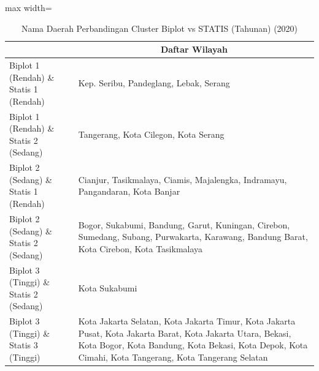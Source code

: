 \begin{table}[H]
\centering
\caption{Nama Daerah Perbandingan Cluster Biplot vs STATIS (Tahunan) (2020)} \label{tab:app1biplot_statis_comp_name_2020}
\begin{adjustbox}{max width=\textwidth}
\begin{tabular}{|>{\centering\arraybackslash}p{4cm}|p{10cm}|}
\hline
\multicolumn{1}{|c|}{\textbf{Kategori}} & \multicolumn{1}{c|}{\textbf{Daftar Wilayah}} \\
\hline
Biplot 1 (Rendah) \& Statis 1 (Rendah) & Kep. Seribu, Pandeglang, Lebak, Serang \\
\hline
Biplot 1 (Rendah) \& Statis 2 (Sedang) & Tangerang, Kota Cilegon, Kota Serang \\
\hline
Biplot 2 (Sedang) \& Statis 1 (Rendah) & Cianjur, Tasikmalaya, Ciamis, Majalengka, Indramayu, Pangandaran, Kota Banjar \\
\hline
Biplot 2 (Sedang) \& Statis 2 (Sedang) & Bogor, Sukabumi, Bandung, Garut, Kuningan, Cirebon, Sumedang, Subang, Purwakarta, Karawang, Bandung Barat, Kota Cirebon, Kota Tasikmalaya \\
\hline
Biplot 3 (Tinggi) \& Statis 2 (Sedang) & Kota Sukabumi \\
\hline
Biplot 3 (Tinggi) \& Statis 3 (Tinggi) & Kota Jakarta Selatan, Kota Jakarta Timur, Kota Jakarta Pusat, Kota Jakarta Barat, Kota Jakarta Utara, Bekasi, Kota Bogor, Kota Bandung, Kota Bekasi, Kota Depok, Kota Cimahi, Kota Tangerang, Kota Tangerang Selatan \\
\hline
\end{tabular}
\end{adjustbox}
\end{table}